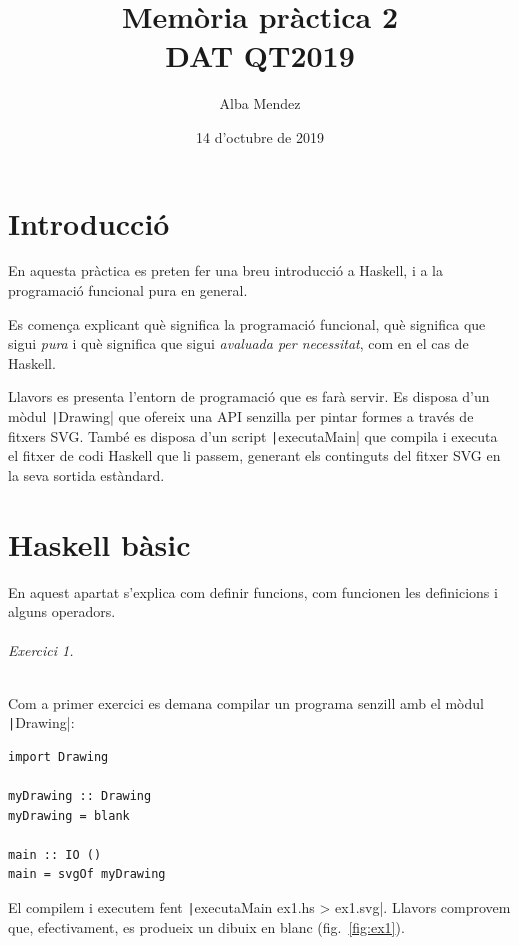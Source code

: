 \documentclass[catalan, a4paper]{scrartcl}
\author{Alba Mendez}
\title{Memòria pràctica 2\\
{\small DAT QT2019}}
\date{14 d'octubre de 2019}
\begin{document}
\maketitle


\part{Introducció}

En aquesta pràctica es preten fer una breu introducció a Haskell, i
a la programació funcional pura en general.

Es comença explicant què
significa la programació funcional, què significa que sigui \emph{pura}
i què significa que sigui \emph{avaluada per necessitat}, com en el cas
de Haskell.

Llavors es presenta l'entorn de programació que es farà servir. Es
disposa d'un mòdul \texttt|Drawing| que ofereix una API
senzilla per pintar formes a través de fitxers SVG. També es disposa d'un
script \texttt|executaMain| que compila i executa el fitxer
de codi Haskell que li passem, generant els continguts del fitxer SVG
en la seva sortida estàndard.

\clearpage

\part{Haskell bàsic}

En aquest apartat s'explica com definir funcions, com funcionen les
definicions i alguns operadors.

\paragraph{Exercici 1.} Com a primer exercici es demana compilar un
programa senzill amb el mòdul \texttt|Drawing|:

\begin{verbatim}
import Drawing

myDrawing :: Drawing
myDrawing = blank

main :: IO ()
main = svgOf myDrawing  
\end{verbatim}

El compilem i executem fent \texttt|executaMain ex1.hs > ex1.svg|.
Llavors comprovem que, efectivament, es produeix un dibuix en
blanc (fig.~\ref{fig:ex1}).
\end{document}
